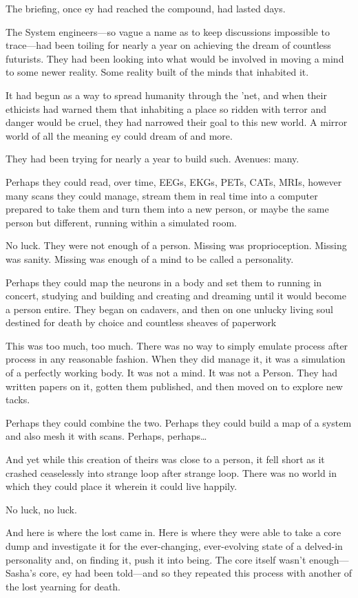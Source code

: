 The briefing, once ey had reached the compound, had lasted days.

The System engineers—so vague a name as to keep discussions impossible to trace—had been toiling for nearly a year on achieving the dream of countless futurists. They had been looking into what would be involved in moving a mind to some newer reality. Some reality built of the minds that inhabited it.

It had begun as a way to spread humanity through the 'net, and when their ethicists had warned them that inhabiting a place so ridden with terror and danger would be cruel, they had narrowed their goal to this new world. A mirror world of all the meaning ey could dream of and more.

They had been trying for nearly a year to build such. Avenues: many.

Perhaps they could read, over time, EEGs, EKGs, PETs, CATs, MRIs, however many scans they could manage, stream them in real time into a computer prepared to take them and turn them into a new person, or maybe the same person but different, running within a simulated room.

No luck. They were not enough of a person. Missing was proprioception. Missing was sanity. Missing was enough of a mind to be called a personality.

Perhaps they could map the neurons in a body and set them to running in concert, studying and building and creating and dreaming until it would become a person entire. They began on cadavers, and then on one unlucky living soul destined for death by choice and countless sheaves of paperwork

This was too much, too much. There was no way to simply emulate process after process in any reasonable fashion. When they did manage it, it was a simulation of a perfectly working body. It was not a mind. It was not a Person. They had written papers on it, gotten them published, and then moved on to explore new tacks.

Perhaps they could combine the two. Perhaps they could build a map of a system and also mesh it with scans. Perhaps, perhaps\ldots{}

And yet while this creation of theirs was close to a person, it fell short as it crashed ceaselessly into strange loop after strange loop. There was no world in which they could place it wherein it could live happily.

No luck, no luck.

And here is where the lost came in. Here is where they were able to take a core dump and investigate it for the ever-changing, ever-evolving state of a delved-in personality and, on finding it, push it into being. The core itself wasn't enough—Sasha's core, ey had been told—and so they repeated this process with another of the lost yearning for death.

